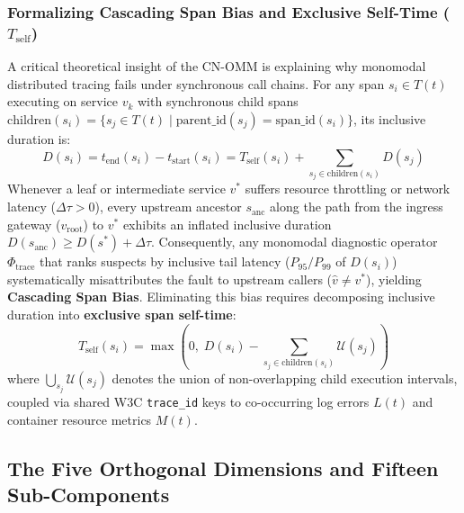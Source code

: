 \subsubsection{Formalizing Cascading Span Bias and Exclusive Self-Time ($T_{\text{self}}$)}
A critical theoretical insight of the CN-OMM is explaining why monomodal distributed tracing fails under synchronous call chains. For any span $s_i \in T(t)$ executing on service $v_k$ with synchronous child spans $\text{children}(s_i) = \{s_j \in T(t) \mid \text{parent\_id}(s_j) = \text{span\_id}(s_i)\}$, its inclusive duration is:
\begin{equation}
    D(s_i) = t_{\text{end}}(s_i) - t_{\text{start}}(s_i) = T_{\text{self}}(s_i) + \sum_{s_j \in \text{children}(s_i)} D(s_j)
    \label{eq:inclusive_duration}
\end{equation}
Whenever a leaf or intermediate service $v^*$ suffers resource throttling or network latency ($\Delta \tau > 0$), every upstream ancestor $s_{\text{anc}}$ along the path from the ingress gateway ($v_{\text{root}}$) to $v^*$ exhibits an inflated inclusive duration $D(s_{\text{anc}}) \ge D(s^*) + \Delta \tau$. Consequently, any monomodal diagnostic operator $\Phi_{\text{trace}}$ that ranks suspects by inclusive tail latency ($P_{95}/P_{99}$ of $D(s_i)$) systematically misattributes the fault to upstream callers ($\hat{v} \neq v^*$), yielding \textbf{Cascading Span Bias}. Eliminating this bias requires decomposing inclusive duration into \textbf{exclusive span self-time}:
\begin{equation}
    T_{\text{self}}(s_i) = \max\left(0, \; D(s_i) - \sum_{s_j \in \text{children}(s_i)} \mathcal{U}(s_j)\right)
    \label{eq:exclusive_selftime}
\end{equation}
where $\bigcup_{s_j} \mathcal{U}(s_j)$ denotes the union of non-overlapping child execution intervals, coupled via shared W3C \texttt{trace\_id} keys to co-occurring log errors $L(t)$ and container resource metrics $M(t)$.

\subsection{The Five Orthogonal Dimensions and Fifteen Sub-Components}
\label{subsec:dimensions}

